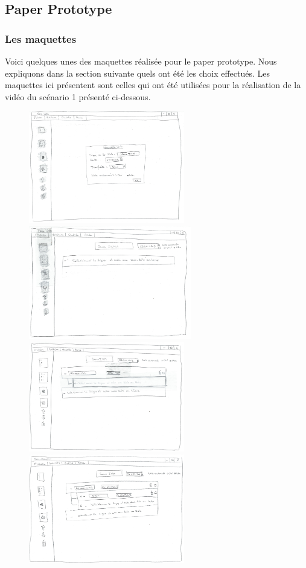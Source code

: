 \documentclass[a4paper,10pt]{article}
\begin{document}
\subsection{Paper Prototype}

\subsubsection{Les maquettes}
Voici quelques unes des maquettes réalisée pour le paper prototype. Nous expliquons dans la section suivante quels ont été les choix effectués. Les maquettes ici présentent sont celles qui ont été utilisées pour la réalisation de la vidéo du scénario 1 présenté ci-dessous.
\begin{figure}[H]
    \center
    \includegraphics[width=6.8cm]{Images/maquette1.jpeg}
    \includegraphics[width=7.1cm]{Images/maquette2.jpeg}
    \includegraphics[width=6.8cm]{Images/maquette3.jpeg}
    \includegraphics[width=6.8cm]{Images/maquette4.jpeg}

\end{figure}
\end{document}
